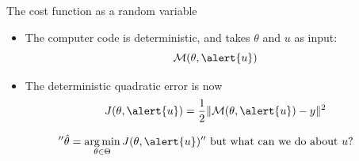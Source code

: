 \documentclass[10pt,aspectratio=169,usepdftitle=false]{beamer}
\newcommand{\Kspace}{\Theta}
\DeclareMathOperator*{\argmin}{arg\,min}
\newcommand{\yobs}{y}
\newcommand{\kk}{\theta}
\newcommand{\uu}{u}
\begin{document}
\begin{frame}{The cost function as a random variable}
  \begin{itemize}
  \item The computer code is deterministic, and takes $\kk$ and $\uu$
    as input:
    \begin{equation*}
      \mathcal{M}(\kk,\alert{\uu})
    \end{equation*}
  \item The deterministic quadratic error is now
    \begin{equation*}
      J(\kk,\alert{\uu}) =  \frac12\|\mathcal{M}(\kk,\alert{\uu}) - \yobs\|^2
    \end{equation*}
  \end{itemize}

\begin{equation*}
  ''\hat{\kk} = \argmin_{\kk\in\Kspace} J(\kk,\alert{\uu})'' \text{ but what can we do about } \uu ?
\end{equation*}
\end{frame}
\end{document}
